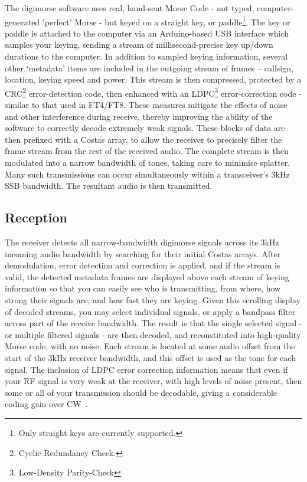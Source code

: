 \documentclass[a4paper]{tufte-handout}
\begin{document}
    The digimorse software uses real, hand-sent Morse Code - not typed, computer-generated 'perfect' Morse - but keyed
    on a straight key, or paddle\footnote{Only straight keys are currently supported.}.
    The key or paddle is attached to the computer via an Arduino-based USB interface which samples your keying,
    sending a stream of millisecond-precise key up/down durations to the computer.
    In addition to sampled keying information, several other ‘metadata’ items are included in the outgoing stream of
    frames – callsign, location, keying speed and power.
    This stream is then compressed, protected by a CRC\footnote{Cyclic Redundancy Check.} error-detection code, then
    enhanced with an LDPC\footnote{Low-Density Parity-Check} error-correction code\cite{Gallager1962} - similar to
    that used in FT4/FT8.
    These measures mitigate the effects of noise and other interference during receive, thereby improving the ability
    of the software to correctly decode extremely weak signals.
    These blocks of data are then prefixed with a Costas array\cite{Hasselbeck2019}, to allow the receiver to 
    precisely filter the frame stream from the rest of the received audio.
    The complete stream is then modulated into a narrow bandwidth of tones, taking care to minimise splatter.
    Many such transmissions can occur simultaneously within a transceiver’s 3kHz SSB bandwidth.
    The resultant audio is then transmitted.

\subsection{Reception}

    The receiver detects all narrow-bandwidth digimorse signals across its 3kHz incoming audio bandwidth by searching
    for their initial Costas arrays.
    After demodulation, error detection and correction is applied, and if the stream is valid, the detected metadata
    frames are displayed above each stream of keying information so that you can easily see who is
    transmitting, from where, how strong their signals are, and how fast they are keying.
    Given this scrolling display of decoded streams, you may select individual signals, or apply a bandpass filter
    across part of the receive bandwidth.
    The result is that the single selected signal - or multiple filtered signals - are then decoded, and
    reconstituted into high-quality Morse code, with no noise.
    Each stream is located at some audio offset from the start of the 3kHz receiver bandwidth, and this offset is used
    as the tone for each signal.
    The inclusion of LDPC error correction information means that even if your RF signal is very weak at the
    receiver, with high levels of noise present, then some or all of your transmission should be decodable, giving a
    considerable coding gain over CW~\cite{Punch2013}.
\end{document}
